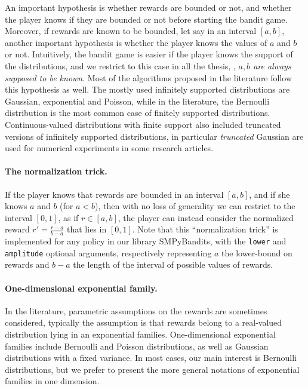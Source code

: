 An important hypothesis is whether rewards are bounded or not,
and whether the player knows if they are bounded or not before starting the bandit game.
Moreover, if rewards are known to be bounded, let say in an interval $[a,b]$, another important hypothesis is whether the player knows the values of $a$ and $b$ or not.
%
Intuitively, the bandit game is easier if the player knows the support of the distributions, and we restrict to this case in all the thesis, \ie, \emph{$a,b$ are always supposed to be known}.
Most of the algorithms proposed in the literature follow this hypothesis as well.
%
The mostly used
infinitely supported distributions are Gaussian, exponential and Poisson,
while in the literature, the Bernoulli distribution is the most common case of finitely supported distributions.
Continuous-valued distributions with finite support also included truncated versions of infinitely supported distributions, in particular \emph{truncated} Gaussian are used for numerical experiments in some research articles.

\paragraph{The normalization trick.}
\label{par:2:normalizationTrick}
%
If the player knows that rewards are bounded in an interval $[a,b]$, and if she knows $a$ and $b$ (for $a<b$), then with no loss of generality we can restrict to the interval $[0,1]$, as if $r\in[a,b]$, the player can instead consider the normalized reward $r' = \frac{r-a}{b-a}$ that lies in $[0,1]$.
Note that this ``normalization trick'' is implemented for any policy in our library SMPyBandits, with the \texttt{lower} and \texttt{amplitude} optional arguments, respectively representing $a$ the lower-bound on rewards and $b-a$ the length of the interval of possible values of rewards.


\paragraph{One-dimensional exponential family.}
%

In the literature, parametric assumptions on the rewards are sometimes considered, typically the assumption is that rewards belong to a real-valued distribution lying in an exponential families.
One-dimensional exponential families include Bernoulli and Poisson distributions, as well as Gaussian distributions with a fixed variance.
In most cases, our main interest is Bernoulli distributions, but we prefer to present the more general notations of exponential families in one dimension.

